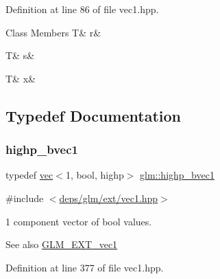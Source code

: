 Definition at line 86 of file vec1.\+hpp.

\begin{DoxyFields}{Class Members}
\mbox{\label{group__ext__vec1_a4b43b0aee35624cd95b910189b3dc231}} 
T&
r&
\\
\hline

\mbox{\label{group__ext__vec1_a03c7c0ace395d80182db07ae2c30f034}} 
T&
s&
\\
\hline

\mbox{\label{group__ext__vec1_a9dd4e461268c8034f5c8564e155c67a6}} 
T&
x&
\\
\hline

\end{DoxyFields}


\subsection{Typedef Documentation}
\mbox{\label{group__ext__vec1_gac7fdd0536d878f87393132b3a7f9ef03}} 
\subsubsection{\texorpdfstring{highp\+\_\+bvec1}{highp\_bvec1}}
{\footnotesize\ttfamily typedef \hyperlink{structglm_1_1vec}{vec}$<$1, bool, highp$>$ \hyperlink{group__ext__vec1_gac7fdd0536d878f87393132b3a7f9ef03}{glm\+::highp\+\_\+bvec1}}



{\ttfamily \#include $<$\hyperlink{ext_2vec1_8hpp}{deps/glm/ext/vec1.\+hpp}$>$}

1 component vector of bool values.

\begin{DoxySeeAlso}{See also}
\hyperlink{group__ext__vec1}{G\+L\+M\+\_\+\+E\+X\+T\+\_\+vec1} 
\end{DoxySeeAlso}


Definition at line 377 of file vec1.\+hpp.

\mbox{\label{group__ext__vec1_ga51e54e6b2fe3962fc44a176eeb3e3fe6}} 
